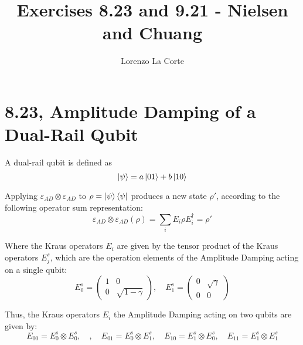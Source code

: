 \documentclass{masterthesis}
\begin{document}
\title{Exercises 8.23 and 9.21 - Nielsen and Chuang}

\author{Lorenzo La Corte}

\advisor{}

\examiner{}

\maketitle

\section*{8.23, Amplitude Damping of a Dual-Rail Qubit}

A dual-rail qubit is defined as
\begin{equation}
    \ket{\psi}=a\ket{01}+b\ket{10}
\end{equation}

Applying $\varepsilon_{A D} \otimes \varepsilon_{A D}$ to $\rho=\ket{\psi}\bra{\psi}$ produces a new state $\rho'$, according to the following operator sum representation:
\begin{equation}
    \varepsilon_{A D} \otimes \varepsilon_{A D}(\rho) = \sum_{i} E_{i} \rho E_{i}^{\dagger} = \rho'
\end{equation}

Where the Kraus operators $E_{i}$ are given by the tensor product of the Kraus operators $E_{j}^{s}$, which are the operation elements of the Amplitude Damping acting on a single qubit:
\begin{equation}
    E_{0}^{s} = \begin{pmatrix} 1 & 0 \\ 0 & \sqrt{1-\gamma} \end{pmatrix}, \quad E_{1}^{s} = \begin{pmatrix} 0 & \sqrt{\gamma} \\ 0 & 0 \end{pmatrix}
\end{equation}

Thus, the Kraus operators $E_{i}$ the Amplitude Damping acting on two qubits are given by:
\begin{equation}
    E_{00} = E_{0}^{s} \otimes E_{0}^{s}, \quad , \quad E_{01} = E_{0}^{s} \otimes E_{1}^{s}, \quad E_{10} = E_{1}^{s} \otimes E_{0}^{s}, \quad E_{11} = E_{1}^{s} \otimes E_{1}^{s}
\end{equation}
\end{document}
